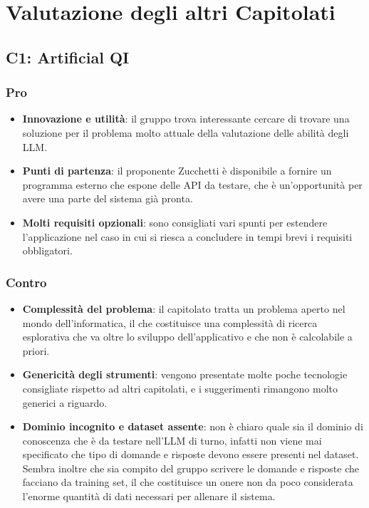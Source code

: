 \section{Valutazione degli altri Capitolati}


\subsection{C1: Artificial QI}

\subsubsection{Pro}

\begin{itemize}
    \item \textbf{Innovazione e utilità}: il gruppo trova interessante cercare di trovare una soluzione per il problema molto attuale della valutazione delle abilità degli LLM.
    \item \textbf{Punti di partenza}: il proponente Zucchetti è disponibile a fornire un programma esterno che espone delle API da testare, che è un'opportunità per avere una parte del sistema già pronta.
    \item \textbf{Molti requisiti opzionali}: sono consigliati vari spunti per estendere l'applicazione nel caso in cui si riesca a concludere in tempi brevi i requisiti obbligatori.
\end{itemize}

\subsubsection{Contro}

\begin{itemize}
    \item \textbf{Complessità del problema}: il capitolato tratta un problema aperto nel mondo dell'informatica, il che costituisce una complessità di ricerca esplorativa che va oltre lo sviluppo dell'applicativo e che non è calcolabile a priori.
    \item \textbf{Genericità degli strumenti}: vengono presentate molte poche tecnologie consigliate rispetto ad altri capitolati, e i suggerimenti rimangono molto generici a riguardo.
    \item \textbf{Dominio incognito e dataset assente}: non è chiaro quale sia il dominio di conoscenza che è da testare nell'LLM di turno, infatti non viene mai specificato che tipo di domande e risposte devono essere presenti nel dataset. Sembra inoltre che sia compito del gruppo scrivere le domande e risposte che facciano da training set, il che costituisce un onere non da poco considerata l'enorme quantità di dati necessari per allenare il sistema.
\end{itemize}



